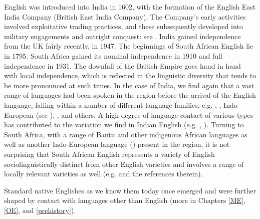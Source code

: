English was introduced into India in 1602, with the formation of the English East India Company (British East India Company). The Company's early activities involved exploitative trading practices, and these subsequently developed into military engagements and outright conquest: see \citet{Dalrymple2019}. India gained independence from the UK fairly recently, in 1947. The beginnings of South African English lie in 1795. South Africa gained its nominal independence in 1910 and full independence in 1931. The downfall of the British Empire goes hand in hand with local independence, which is reflected in the linguistic diversity that tends to be more pronounced at such times. In the case of India, we find again that a vast range of languages had been spoken in the region before the arrival of the English language, falling within a number of different language families, e.g. , , Indo-European (see ), , and others. A high degree of language contact of various types has contributed to the variation we find in Indian English (e.g. \citealp{Sailaja2012}, \citealp{Wells1982c}). Turning to South Africa, with a range of Bantu and other indigenous African languages as well as another Indo-European language () present in the region, it is not surprising that South African English represents a variety of English sociolinguistically distinct from other English varieties and involves a range of locally relevant varieties as well (e.g. \citealp{Mesthrie2015} and the references therein).

Standard native Englishes as we know them today once emerged and were further shaped by contact with languages other than English (more in Chapters \ref{ME}, \ref{OE}, and \ref{prehistory}).


